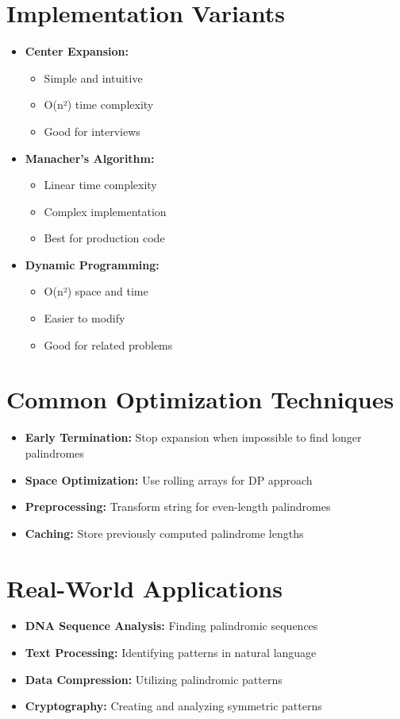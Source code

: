 \section*{Implementation Variants}
\begin{itemize}
    \item \textbf{Center Expansion:}
        \begin{itemize}
            \item Simple and intuitive
            \item O(n²) time complexity
            \item Good for interviews
        \end{itemize}
    \item \textbf{Manacher's Algorithm:}
        \begin{itemize}
            \item Linear time complexity
            \item Complex implementation
            \item Best for production code
        \end{itemize}
    \item \textbf{Dynamic Programming:}
        \begin{itemize}
            \item O(n²) space and time
            \item Easier to modify
            \item Good for related problems
        \end{itemize}
\end{itemize}

\section*{Common Optimization Techniques}
\begin{itemize}
    \item \textbf{Early Termination:} Stop expansion when impossible to find longer palindromes
    \item \textbf{Space Optimization:} Use rolling arrays for DP approach
    \item \textbf{Preprocessing:} Transform string for even-length palindromes
    \item \textbf{Caching:} Store previously computed palindrome lengths
\end{itemize}

\section*{Real-World Applications}
\begin{itemize}
    \item \textbf{DNA Sequence Analysis:} Finding palindromic sequences
    \item \textbf{Text Processing:} Identifying patterns in natural language
    \item \textbf{Data Compression:} Utilizing palindromic patterns
    \item \textbf{Cryptography:} Creating and analyzing symmetric patterns
\end{itemize}

